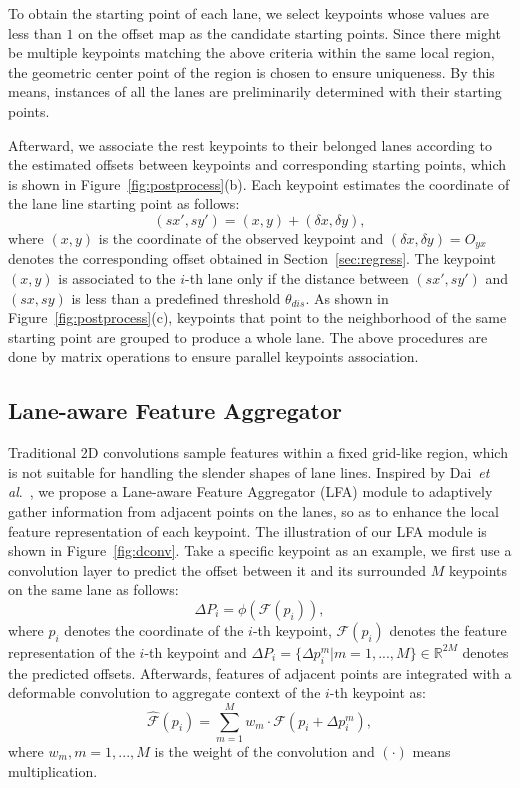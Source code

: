 \documentclass[10pt,twocolumn,letterpaper]{article}
\begin{document}
To obtain the starting point of each lane, we select keypoints whose values are less than $1$ on the offset map as the candidate starting points.
Since there might be multiple keypoints matching the above criteria within the same local region, the geometric center point of the region is chosen to ensure uniqueness.
By this means, instances of all the lanes are preliminarily determined with their starting points.

Afterward, we associate the rest keypoints to their belonged lanes according to the estimated offsets between keypoints and corresponding starting points, which is shown in Figure~\ref{fig:postprocess}(b).
Each keypoint estimates the coordinate of the lane line starting point as follows:
\begin{equation}
\label{equation:startpoing}
(sx', sy') = (x, y) + (\delta x, \delta y),
\end{equation}
where $(x, y)$ is the coordinate of the observed keypoint and $(\delta x, \delta y) = O_{yx}$ denotes the corresponding offset obtained in Section~\ref{sec:regress}.
The keypoint $(x,y)$ is associated to the $i$-th lane only if the distance between $(sx', sy')$ and $(sx, sy)$ is less than a predefined threshold $\theta_{dis}$.
As shown in Figure~\ref{fig:postprocess}(c), keypoints that point to the neighborhood of the same starting point are grouped to produce a whole lane. The above procedures are done by matrix operations to ensure parallel keypoints association.

\subsection{Lane-aware Feature Aggregator}
Traditional 2D convolutions sample features within a fixed grid-like region, which is not suitable for handling the slender shapes of lane lines. 
Inspired by Dai~\textit{et al}.~\cite{dai2017deformable}, we propose a Lane-aware Feature Aggregator (LFA) module to adaptively gather information from adjacent points on the lanes, so as to enhance the local feature representation of each keypoint.
The illustration of our LFA module is shown in Figure~\ref{fig:dconv}. 
Take a specific keypoint as an example, we first use a convolution layer to predict the offset between it and its surrounded $M$ keypoints on the same lane as follows:
\begin{equation}
    \Delta{P_i}=\phi(\mathcal{F}(p_i)), 
    \label{equation:offset}
\end{equation}
where $p_i$ denotes the coordinate of the $i$-th keypoint, $\mathcal{F}(p_i)$ denotes the feature representation of the $i$-th keypoint and $\Delta{P_i} = \{\Delta{p_i^m}|m=1,...,M\} \in \mathbb{R}^{2M}$ denotes the predicted offsets. 
Afterwards, features of adjacent points are integrated with a deformable convolution to aggregate context of the $i$-th keypoint as:
\begin{equation}
    \hat{\mathcal{F}}(p_i)=\sum_{m=1}^M{w_m\cdot\mathcal{F}(p_i+\Delta{p_i^m})},
    \label{equation:sumup}
\end{equation}
where $w_m, m=1,...,M$ is the weight of the convolution and $(\cdot)$ means multiplication. 
\end{document}
